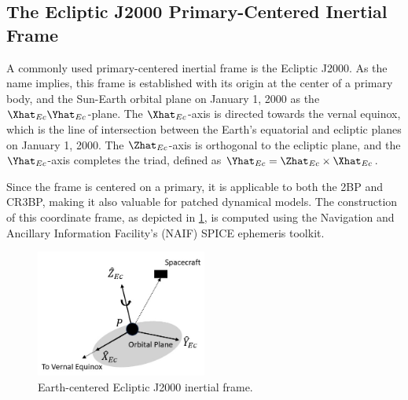 \subsection{The Ecliptic J2000 Primary-Centered Inertial Frame}
A commonly used primary-centered inertial frame is the Ecliptic J2000. As the name implies, this
frame is established with its origin at the center of a primary body, and the Sun-Earth orbital
plane on January 1, 2000 as the $\Xhat_{Ec}\Yhat_{Ec}$-plane. The $\Xhat_{Ec}$-axis is directed
towards the vernal equinox, which is the line of intersection between the Earth's equatorial and
ecliptic planes on January 1, 2000. The $\Zhat_{Ec}$-axis is orthogonal to the ecliptic plane, and
the $\Yhat_{Ec}$-axis completes the triad, defined as $\Yhat_{Ec}=\Zhat_{Ec}\times\Xhat_{Ec}$.

Since the frame is centered on a primary, it is applicable to both the 2BP and CR3BP, making it
also valuable for patched dynamical models. The construction of this coordinate frame, as depicted
in \cref{fig:eclipJ2000Frame}, is computed using the Navigation and Ancillary Information
Facility's (NAIF) SPICE ephemeris toolkit\cite{Semenov:2023}.

\begin{figure}[ht]
    \centering
    \includegraphics[width=0.5\textwidth]{figures/EclipJ2000Frame.jpg}
    \caption{Earth-centered Ecliptic J2000 inertial frame.}
    \label{fig:eclipJ2000Frame}
\end{figure}
